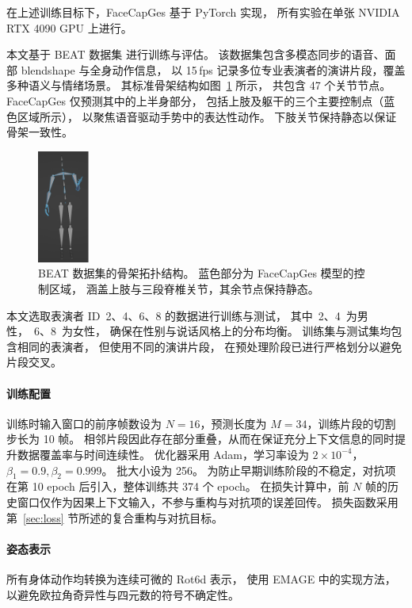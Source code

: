 在上述训练目标下，FaceCapGes 基于 PyTorch 实现，
所有实验在单张 NVIDIA RTX 4090 GPU 上进行。

本文基于 BEAT 数据集\cite{beatcamn} 进行训练与评估。
该数据集包含多模态同步的语音、面部 blendshape 与全身动作信息，
以 15\,fps 记录多位专业表演者的演讲片段，覆盖多种语义与情绪场景。
其标准骨架结构如图~\ref{fig_beatbones} 所示，
共包含 47 个关节节点。
FaceCapGes 仅预测其中的上半身部分，
包括上肢及躯干的三个主要控制点（蓝色区域所示），
以聚焦语音驱动手势中的表达性动作。
下肢关节保持静态以保证骨架一致性。

\begin{figure}[h!t]
\centering
\includegraphics[width=0.15\textwidth]{figures/Fig_BEATBones.png}
\caption{
BEAT 数据集的骨架拓扑结构。
蓝色部分为 FaceCapGes 模型的控制区域，
涵盖上肢与三段脊椎关节，其余节点保持静态。
}
\label{fig_beatbones}
\end{figure}

本文选取表演者 ID~2、4、6、8 的数据进行训练与测试，
其中~2、4~为男性，~6、8~为女性，
确保在性别与说话风格上的分布均衡。
训练集与测试集均包含相同的表演者，
但使用不同的演讲片段，
在预处理阶段已进行严格划分以避免片段交叉。

\paragraph{训练配置}
训练时输入窗口的前序帧数设为 $N=16$，预测长度为 $M=34$，训练片段的切割步长为 10 帧。
相邻片段因此存在部分重叠，从而在保证充分上下文信息的同时提升数据覆盖率与时间连续性。
优化器采用 Adam\cite{adam2017}，学习率设为 $2\times10^{-4}$，$\beta_1=0.9, \beta_2=0.999$。
批大小设为 256。
为防止早期训练阶段的不稳定，对抗项在第 10 epoch 后引入，整体训练共 374 个 epoch。
在损失计算中，前 $N$ 帧的历史窗口仅作为因果上下文输入，不参与重构与对抗项的误差回传。
损失函数采用第~\ref{sec:loss} 节所述的复合重构与对抗目标。

\paragraph{姿态表示}
所有身体动作均转换为连续可微的 Rot6d 表示，
使用 EMAGE\cite{emage} 中的实现方法，
以避免欧拉角奇异性与四元数的符号不确定性。

